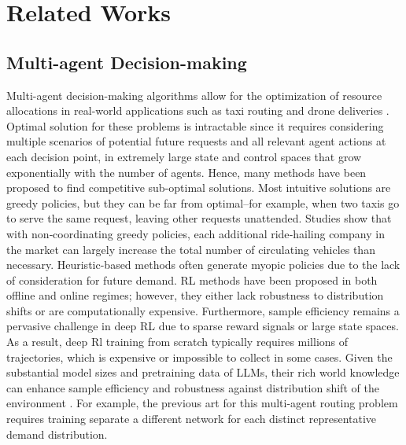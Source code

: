 \section{Related Works}
\subsection{Multi-agent Decision-making}
Multi-agent decision-making algorithms allow for the optimization of resource allocations in real-world applications such as taxi routing \cite{garces2023multiagent} and drone deliveries \cite{lee2022autonomous}. Optimal solution for these problems is intractable since it requires considering multiple scenarios of potential future requests and all relevant agent actions at each decision point, in extremely large state and control spaces that grow exponentially with the number of agents. Hence, many methods have been proposed to find competitive sub-optimal solutions. Most intuitive solutions are greedy policies, but they can be far from optimal--for example, when two taxis go to serve the same request, leaving other requests unattended. Studies \cite{kondor2022cost, vazifeh2018addressing} show that with non‐coordinating greedy policies, each additional ride‐hailing company in the market can largely increase the total number of circulating vehicles than necessary. Heuristic-based methods \cite{bertsekas1979distributed, bertsimas2019online, croes1958method} often generate myopic policies due to the lack of consideration for future demand. RL methods have been proposed in both offline \cite{ulmer2019offline, farazi2021deep} and online \cite{silver2010monte, somani2013despot, bent2004scenario} regimes; however, they either lack robustness to distribution shifts or are computationally expensive. Furthermore, sample efficiency remains a pervasive challenge in deep RL \cite{li2021breaking, li2023deep} due to sparse reward signals or large state spaces. As a result, deep Rl training from scratch typically requires millions of trajectories, which is expensive or impossible to collect in some cases. Given the substantial model sizes and pretraining data of LLMs, their rich world knowledge can enhance sample efficiency \cite{ahn2022can, morad2024language, ajay2024compositional, zhang2024improving} and robustness against distribution shift of the environment \cite{ge2024openagi, wang2023robustness}. For example, the previous art for this multi-agent routing problem \cite{garces2023multiagent} requires training separate a different network for each distinct representative demand distribution.


